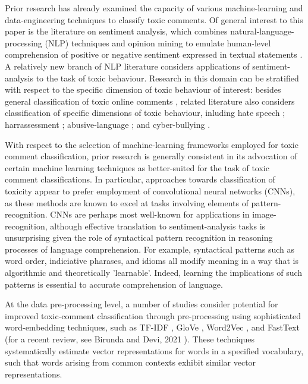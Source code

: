 
Prior research has already examined the capacity of various machine-learning and data-engineering techniques to classify toxic comments. 
Of general interest to this paper is the literature on sentiment analysis, which combines natural-language-processing (NLP) techniques and opinion mining to emulate human-level comprehension of positive or negative sentiment expressed in textual statements \cite{chowdhary2020natural, cambria2014jumping}.
A relatively new branch of NLP literature considers applications of sentiment-analysis to the task of toxic behaviour. 
Research in this domain can be stratified with respect to the specific dimension of toxic behaviour of interest: besides general classification of toxic online comments \cite{georgakopoulos2018convolutional,van2018challenges,risch2020toxic}, related literature also considers classification of specific dimensions of toxic behaviour, inluding hate speech \cite{mullah2021advances, ayo2020machine, rizos2019augment, yang2019exploring}; harrassessment \cite{abarna2022identification, basu2021cyberpolice, marwa2018deep}; abusive-language \cite{vidgen2020directions, nobata2016abusive, bourgonje2017automatic}; and cyber-bullying \cite{kanan2020cyber, akhter2019cyber, di2016unsupervised}.

With respect to the selection of machine-learning frameworks employed for toxic comment classification, prior research is generally consistent in its advocation of certain machine learning techniques as better-suited for the task of toxic comment classifications. In particular, approaches towards classification of toxicity appear to prefer employment of convolutional neural networks (CNNs), as these methods are known to excel at tasks involving elements of pattern-recognition. CNNs are perhaps most well-known for applications in image-recognition, although effective translation to sentiment-analysis tasks is unsurprising given the role of syntactical pattern recognition in reasoning processes of language comprehension. For example, syntactical patterns such as word order, indiciative pharases, and idioms all modify meaning in a way that is algorithmic and theoretically 'learnable'. Indeed, learning the implications of such patterns is essential to accurate comprehension of language. 

At the data pre-processing level, a number of studies consider potential for improved toxic-comment classification through pre-processing using sophisticated word-embedding techniques, such as TF-IDF \cite{luhn1957statistical, jones1972statistical}, GloVe \cite{pennington2014glove}, Word2Vec \cite{mikolov2013efficient,mikolov2013distributed}, and FastText \cite{bojanowski2017enriching, joulin2016bag, joulin2016fasttext} (for a recent review, see Birunda and Devi, 2021 \cite{selva2021review}). These techniques systematically estimate vector representations for words in a specified vocabulary, such that words arising from common contexts exhibit similar vector representations.


